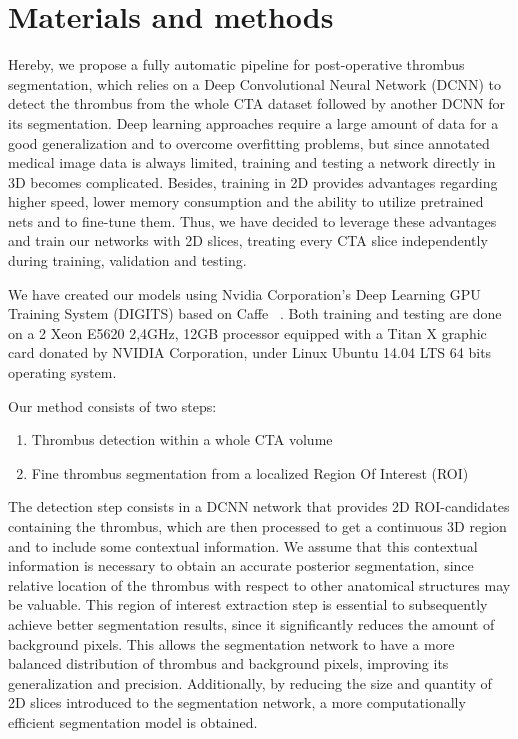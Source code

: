 \documentclass[preprint,authoryear,12pt]{elsarticle}
\begin{document}
\section{Materials and methods}
\label{sec:methods}
Hereby, we propose a fully automatic pipeline for post-operative thrombus segmentation, which relies on a Deep Convolutional Neural Network (DCNN) to detect the thrombus from the whole CTA dataset followed by another DCNN for its segmentation. Deep learning approaches require a large amount of data for a good generalization and to overcome overfitting problems, but since annotated medical image data is always limited, training and testing a network directly in 3D becomes complicated. Besides, training in 2D provides advantages regarding higher speed, lower memory consumption and the ability to utilize pretrained nets and to fine-tune them. Thus, we have decided to leverage these advantages and train our networks with 2D slices, treating every CTA slice independently during training, validation and testing.

We have created our models using Nvidia Corporation's Deep Learning GPU Training System (DIGITS) based on Caffe ~\citep{caffe}. Both training and testing are done on a 2 Xeon E5620 2,4GHz, 12GB processor equipped with a Titan X graphic card donated by NVIDIA Corporation, under Linux Ubuntu 14.04 LTS 64 bits operating system.

Our method consists of two steps: 
\begin{enumerate}
\item Thrombus detection within a whole CTA volume
\item Fine thrombus segmentation from a localized Region Of Interest (ROI)
\end{enumerate}\par

The detection step consists in a DCNN network that provides 2D ROI-candidates containing the thrombus, which are then processed to get a continuous 3D region and to include some contextual information. We assume that this contextual information is necessary to obtain an accurate posterior segmentation, since relative location of the thrombus with respect to other anatomical structures may be valuable. This region of interest extraction step is essential to subsequently achieve better segmentation results, since it significantly reduces the amount of background pixels. This allows the segmentation network to have a more balanced distribution of thrombus and background pixels, improving its generalization and precision. Additionally, by reducing the size and quantity of 2D slices introduced to the segmentation network, a more computationally efficient segmentation model is obtained. 
\end{document}
